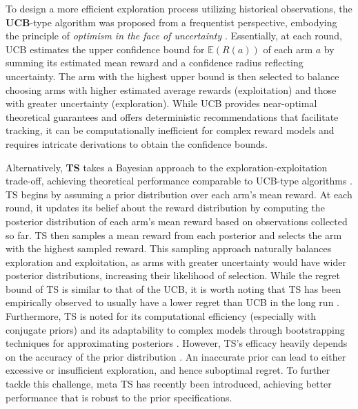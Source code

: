 To design a more efficient exploration process utilizing historical observations, 
the \textbf{\acrfull{UCB}}-type algorithm was proposed from a frequentist perspective, 
embodying the principle of \textit{optimism in the face of uncertainty} \citep{auer2002finite}. 
Essentially, at each round, \acrshort{UCB} estimates the upper confidence bound for $\mathbb{E}(R(a))$ of each arm 
$a$ by summing its estimated mean reward and a confidence radius reflecting uncertainty. The arm with the highest upper bound is then selected to balance choosing arms with higher estimated average rewards (exploitation) and those with greater uncertainty (exploration). While \acrshort{UCB} provides near-optimal theoretical guarantees \citep{slivkins2019introduction} and offers deterministic recommendations that facilitate tracking, it can be computationally inefficient for complex reward models and requires intricate derivations to obtain the confidence bounds. 

Alternatively, \textbf{\acrfull{TS}} takes a Bayesian approach to the exploration-exploitation trade-off, achieving theoretical performance comparable to \acrshort{UCB}-type algorithms \citep{russo2018tutorial,agrawal2013further}. \acrshort{TS} begins by assuming a prior distribution over each arm's mean reward. At each round, it updates its belief about the reward distribution by computing the posterior distribution of each arm’s mean reward based on observations collected so far. \acrshort{TS} then samples a mean reward from each posterior and selects the arm with the highest sampled reward. This sampling approach naturally balances exploration and exploitation, as arms with greater uncertainty would have wider posterior distributions, increasing their likelihood of selection. %
While the regret bound of \acrshort{TS} is similar to that of the \acrshort{UCB}, it is worth noting that \acrshort{TS} has been empirically observed to usually have a lower regret than \acrshort{UCB} in the long run \citep{chapelle2011empirical}. 
Furthermore, \acrshort{TS} is noted for its computational efficiency (especially with conjugate priors)  and its adaptability to complex models through bootstrapping techniques for approximating posteriors \citep{geman1984stochastic,chen2009bayesian,wan2023multiplier}. 
However, \acrshort{TS}'s efficacy heavily depends on the accuracy of the prior distribution \citep{lattimore2020bandit}. 
An inaccurate prior can lead to either excessive or insufficient exploration, and hence suboptimal regret. To further tackle this challenge, meta \acrshort{TS} \citep{kveton2021meta, wan2021metadata, wan2023towards} has recently been introduced, achieving better performance that is robust to the prior specifications. 

